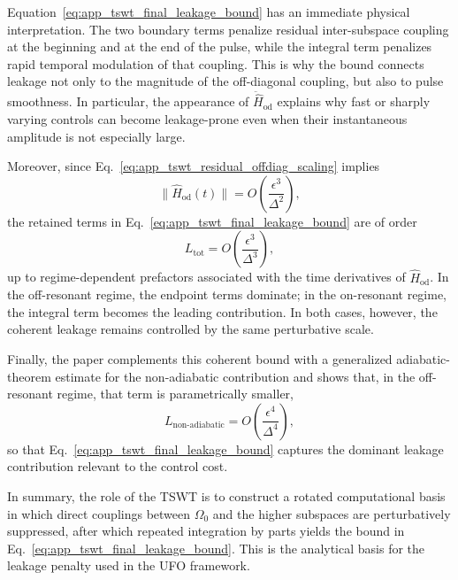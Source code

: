 Equation~\eqref{eq:app_tswt_final_leakage_bound} has an immediate physical interpretation. The two boundary terms penalize residual inter-subspace coupling at the beginning and at the end of the pulse, while the integral term penalizes rapid temporal modulation of that coupling. This is why the bound connects leakage not only to the magnitude of the off-diagonal coupling, but also to pulse smoothness. In particular, the appearance of \(\ddot{\hat H}_{\mathrm{od}}\) explains why fast or sharply varying controls can become leakage-prone even when their instantaneous amplitude is not especially large.

Moreover, since Eq.~\eqref{eq:app_tswt_residual_offdiag_scaling} implies
\begin{equation}
\|\hat{H}_{\mathrm{od}}(t)\|
=
O\!\left(\frac{\epsilon^3}{\Delta^2}\right),
\label{eq:app_tswt_residual_offdiag_norm_scaling}
\end{equation}
the retained terms in Eq.~\eqref{eq:app_tswt_final_leakage_bound} are of order
\begin{equation}
L_{\mathrm{tot}}
=
O\!\left(\frac{\epsilon^3}{\Delta^3}\right),
\label{eq:app_tswt_final_scaling}
\end{equation}
up to regime-dependent prefactors associated with the time derivatives of \(\hat{H}_{\mathrm{od}}\). In the off-resonant regime, the endpoint terms dominate; in the on-resonant regime, the integral term becomes the leading contribution. In both cases, however, the coherent leakage remains controlled by the same perturbative scale.

Finally, the paper complements this coherent bound with a generalized adiabatic-theorem estimate for the non-adiabatic contribution and shows that, in the off-resonant regime, that term is parametrically smaller,
\begin{equation}
L_{\mathrm{non\text{-}adiabatic}}
=
O\!\left(\frac{\epsilon^4}{\Delta^4}\right),
\label{eq:app_tswt_nonadiabatic_subleading}
\end{equation}
so that Eq.~\eqref{eq:app_tswt_final_leakage_bound} captures the dominant leakage contribution relevant to the control cost.

In summary, the role of the TSWT is to construct a rotated computational basis in which direct couplings between \(\Omega_0\) and the higher subspaces are perturbatively suppressed, after which repeated integration by parts yields the bound in Eq.~\eqref{eq:app_tswt_final_leakage_bound}. This is the analytical basis for the leakage penalty used in the UFO framework.


